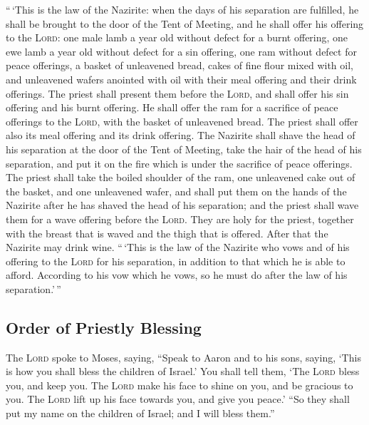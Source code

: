  ``\,`This is the law of the Nazirite: when the days of
his separation are fulfilled, he shall be brought to the door of the
Tent of Meeting,  and he shall offer his offering to the
\textsc{Lord}: one male lamb a year old without defect for a burnt
offering, one ewe lamb a year old without defect for a sin offering, one
ram without defect for peace offerings,  a basket of
unleavened bread, cakes of fine flour mixed with oil, and unleavened
wafers anointed with oil with their meal offering and their drink
offerings.  The priest shall present them before the
\textsc{Lord}, and shall offer his sin offering and his burnt offering.
 He shall offer the ram for a sacrifice of peace
offerings to the \textsc{Lord}, with the basket of unleavened bread. The
priest shall offer also its meal offering and its drink offering.
 The Nazirite shall shave the head of his separation at
the door of the Tent of Meeting, take the hair of the head of his
separation, and put it on the fire which is under the sacrifice of peace
offerings.  The priest shall take the boiled shoulder of
the ram, one unleavened cake out of the basket, and one unleavened
wafer, and shall put them on the hands of the Nazirite after he has
shaved the head of his separation;  and the priest shall
wave them for a wave offering before the \textsc{Lord}. They are holy
for the priest, together with the breast that is waved and the thigh
that is offered. After that the Nazirite may drink wine. 
``\,`This is the law of the Nazirite who vows and of his offering to the
\textsc{Lord} for his separation, in addition to that which he is able
to afford. According to his vow which he vows, so he must do after the
law of his separation.'\,''

\hypertarget{order-of-priestly-blessing}{%
\subsection{Order of Priestly
Blessing}\label{order-of-priestly-blessing}}

 The \textsc{Lord} spoke to Moses, saying,
 ``Speak to Aaron and to his sons, saying, `This is how
you shall bless the children of Israel.' You shall tell them,
 `The \textsc{Lord} bless you, and keep you.
 The \textsc{Lord} make his face to shine on you, and be
gracious to you.  The \textsc{Lord} lift up his face
towards you, and give you peace.'  ``So they shall put my
name on the children of Israel; and I will bless them.''

